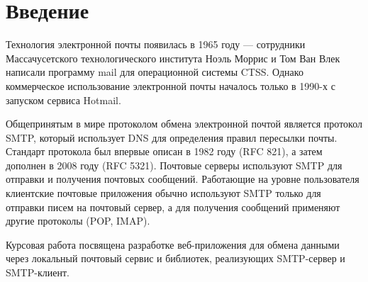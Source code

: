 \chapter*{Введение}

Технология электронной почты появилась в 1965 году --- сотрудники Массачусетского технологического института Ноэль Моррис и Том Ван Влек написали программу mail для операционной системы CTSS. Однако коммерческое использование электронной почты началось только в 1990-х с запуском сервиса Hotmail.

Общепринятым в мире протоколом обмена электронной почтой является протокол SMTP, который использует DNS для определения правил пересылки почты. Стандарт протокола был впервые описан в 1982 году (RFC 821), а затем дополнен в 2008 году (RFC 5321). Почтовые серверы используют SMTP для отправки и получения почтовых сообщений. Работающие на уровне пользователя клиентские почтовые приложения обычно используют SMTP только для отправки писем на почтовый сервер, а для получения сообщений применяют другие протоколы (POP, IMAP).

Курсовая работа посвящена разработке веб-приложения для обмена данными через локальный почтовый сервис и библиотек, реализующих SMTP-сервер и SMTP-клиент.